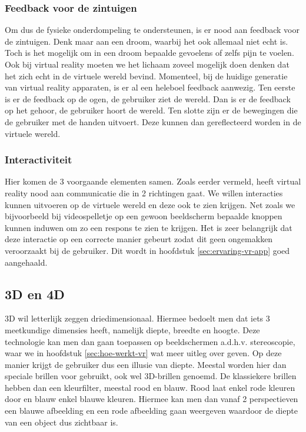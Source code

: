 \subsubsection{Feedback voor de zintuigen}
\label{ssubsec:feedback-van-zintuigen}
Om dus de fysieke onderdompeling te ondersteunen, is er nood aan feedback voor de zintuigen. Denk maar aan een droom, waarbij het ook allemaal niet echt is. Toch is het mogelijk om in een droom bepaalde gevoelens of zelfs pijn te voelen. Ook bij virtual reality moeten we het lichaam zoveel mogelijk doen denken dat het zich echt in de virtuele wereld bevind. Momenteel, bij de huidige generatie van virtual reality apparaten, is er al een heleboel feedback aanwezig. Ten eerste is er de feedback op de ogen, de gebruiker ziet de wereld. Dan is er de feedback op het gehoor, de gebruiker hoort de wereld. Ten slotte zijn er de bewegingen die de gebruiker met de handen uitvoert. Deze kunnen dan gereflecteerd worden in de virtuele wereld.

\subsubsection{Interactiviteit}
\label{ssubsec:interactiviteit}
Hier komen de 3 voorgaande elementen samen. Zoals eerder vermeld, heeft virtual reality nood aan communicatie die in 2 richtingen gaat. We willen  interacties kunnen uitvoeren op de virtuele wereld en deze ook te zien krijgen. Net zoals we bijvoorbeeld bij videospelletje op een gewoon beeldscherm bepaalde knoppen kunnen induwen om zo een respons te zien te krijgen. Het is zeer belangrijk dat deze interactie op een correcte manier gebeurt zodat dit geen ongemakken veroorzaakt bij de gebruiker. Dit wordt in hoofdstuk \ref{sec:ervaring-vr-app} goed aangehaald.

\subsection{3D en 4D}
\label{subsec:3d-4d}
3D wil letterlijk zeggen driedimensionaal. Hiermee bedoelt men dat iets 3 meetkundige dimensies heeft, namelijk diepte, breedte en hoogte. Deze technologie kan men dan gaan toepassen op beeldschermen a.d.h.v. stereoscopie, waar we in hoofdstuk \ref{sec:hoe-werkt-vr} wat meer uitleg over geven. Op deze manier krijgt de gebruiker dus een illusie van diepte. Meestal worden hier dan speciale brillen voor gebruikt, ook wel 3D-brillen genoemd. De klassiekere brillen hebben dan een kleurfilter, meestal rood en blauw. Rood laat enkel rode kleuren door en blauw enkel blauwe kleuren. Hiermee kan men dan vanaf 2 perspectieven een blauwe afbeelding en een rode afbeelding gaan weergeven waardoor de diepte van een object dus zichtbaar is.

